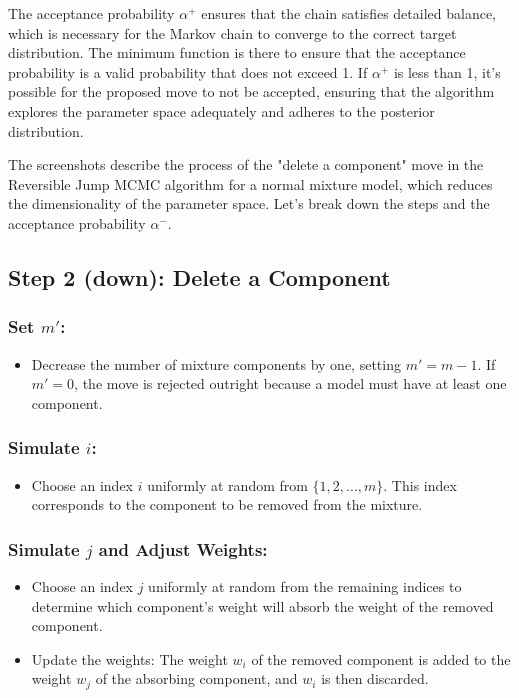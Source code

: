 \documentclass[10pt]{article}
\begin{document}
The acceptance probability \( \alpha^+ \) ensures that the chain satisfies detailed balance, which is necessary for the Markov chain to converge to the correct target distribution. The minimum function is there to ensure that the acceptance probability is a valid probability that does not exceed 1. If \( \alpha^+ \) is less than 1, it's possible for the proposed move to not be accepted, ensuring that the algorithm explores the parameter space adequately and adheres to the posterior distribution.

The screenshots describe the process of the "delete a component" move in the Reversible Jump MCMC algorithm for a normal mixture model, which reduces the dimensionality of the parameter space. Let's break down the steps and the acceptance probability \( \alpha^- \).

\subsection*{Step 2 (down): Delete a Component}

\subsubsection*{Set \( m' \):}
\begin{itemize}
  \item Decrease the number of mixture components by one, setting \( m' = m - 1 \). If \( m' = 0 \), the move is rejected outright because a model must have at least one component.
\end{itemize}

\subsubsection*{Simulate \( i \):}
\begin{itemize}
  \item Choose an index \( i \) uniformly at random from \( \{1, 2, ..., m\} \). This index corresponds to the component to be removed from the mixture.
\end{itemize}

\subsubsection*{Simulate \( j \) and Adjust Weights:}
\begin{itemize}
  \item Choose an index \( j \) uniformly at random from the remaining indices to determine which component's weight will absorb the weight of the removed component.
  \item Update the weights: The weight \( w_i \) of the removed component is added to the weight \( w_j \) of the absorbing component, and \( w_i \) is then discarded.
\end{itemize}
\end{document}
